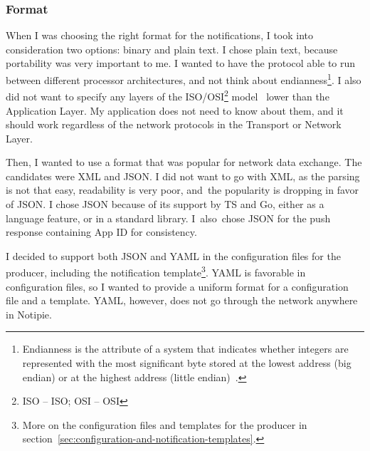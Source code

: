 \subsubsection{Format}\label{sec:protocol-format}

When I was choosing the right format
for the notifications,
I took into consideration two options:
binary and plain text.
I chose plain text,
because portability was very important to me.
I wanted to have the protocol able to run
between different processor architectures,
and not think about endianness\footnote{
  Endianness is the attribute of a system
  that indicates whether integers are represented with
  the most significant byte
  stored at the lowest address (big endian)
  or at the highest address (little endian)~\cite{adiga_how_2007}.
}.
I also did not want to specify any layers of the
ISO/OSI\footnote{
  \acs{ISO} -- \acl{ISO}; \acs{OSI} -- \acl{OSI}
} model~\cite{international_organization_for_standardization_isoiec_1994}
lower than the Application Layer.
My application does not need to know about them,
and it should work regardless of the network protocols
in the Transport or Network Layer.

Then, I wanted to use a format
that was popular for network data exchange.
The candidates were \ac{XML} and \ac{JSON}.
I did not want to go with \ac{XML},
as the parsing is not that easy,
readability is very poor,
and~the popularity is dropping
in favor of \ac{JSON}.
I chose \ac{JSON}
because of its support by \ac{TS} and Go,
either as a language feature,
or in a standard library.
I~also~chose \ac{JSON} for the push response
containing App \ac{ID}
for consistency.

I decided to support both \ac{JSON} and \ac{YAML}
in the configuration files for the producer,
including the notification template\footnote{
  More on the configuration files and templates
  for the producer
  in section~\ref{sec:configuration-and-notification-templates}.
}.
\ac{YAML} is favorable in configuration files,
so I wanted to provide a uniform
format for a configuration file
and a template.
\ac{YAML}, however,
does not go through the network
anywhere in Notipie.

